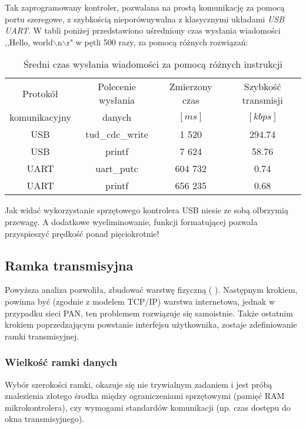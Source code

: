     Tak zaprogramowany kontroler, pozwalana na prostą komunikację za pomocą portu szeregowe, z szybkością nieporównywalna z klasycznymi układami \textit{USB UART}.
    W tabli poniżej przedstawiono uśredniony czas wysłania wiadomości ,,Hello, world$\backslash$n$\backslash$r" w pętli 500 razy, za pomocą różnych rozwiązań:
    \begin{table}[!ht]
        \centering
        \caption{Średni czas wysłania wiadomości za pomocą różnych instrukcji}
        \begin{tabular}{|c|c|c|c|}\hline
            Protokół      & Polecenie wysłania & Zmierzony czas & Szybkość transmisji\\
            komunikacyjny & danych & $[ms]$& $[kbps]$\\\hline
            USB & tud\_cdc\_write &   1 520 & 294.74  \\\hline
            USB & printf          &   7 624 &  58.76  \\\hline
            UART& uart\_putc      & 604 732 &   0.74 \\\hline
            UART& printf          & 656 235 &   0.68 \\\hline
        \end{tabular}
    \end{table}

    Jak widać wykorzystanie sprzętowego kontrolera USB niesie ze sobą olbrzymią przewagę.
    A dodatkowe wyeliminowanie, funkcji formatującej pozwala przyspieszyć prędkość ponad pięciokrotnie!


\subsection{Ramka transmisyjna}
    Powyższa analiza pozwoliła, zbudować warstwę fizyczną ( \cite{Model_TCP_IP}).
    Następnym krokiem, powinna być (zgodnie z modelem TCP/IP) warstwa internetowa, jednak w przypadku sieci PAN, ten problemem rozwiązuje się samoistnie.
    Także ostatnim krokiem poprzedzającym powstanie interfejsu użytkownika, zostaje zdefiniowanie ramki transmisyjnej.

    \subsubsection{Wielkość ramki danych}
        Wybór szerokości ramki, okazuje się nie trywialnym zadaniem i jest próbą znalezienia złotego środka między ograniczeniami sprzętowymi (pamięć RAM mikrokontrolera),
        czy wymogami standardów komunikacji (np. czas dostępu do okna transmisyjnego).

